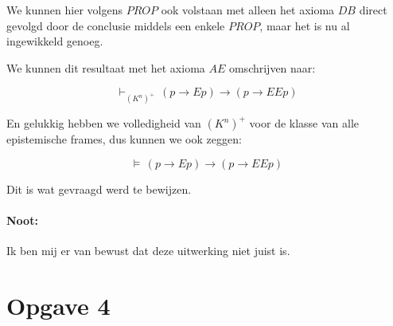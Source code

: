\documentclass[a4paper,11pt]{article}
\begin{document}
We kunnen hier volgens $PROP$ ook volstaan met alleen het axioma $DB$ direct
gevolgd door de conclusie middels een enkele $PROP$, maar het is nu al
ingewikkeld genoeg.

We kunnen dit resultaat met het axioma $AE$ omschrijven naar:

\begin{displaymath}
\vdash_{(K^{n})^{+}} \, (p \to E p) \to (p \to E E p)
\end{displaymath}

En gelukkig hebben we volledigheid van $(K^{n})^{+}$ voor de klasse van alle
epistemische frames, dus kunnen we ook zeggen:

\begin{displaymath}
\vDash \, (p \to E p) \to (p \to E E p)
\end{displaymath}

Dit is wat gevraagd werd te bewijzen.

\paragraph{Noot:}

Ik ben mij er van bewust dat deze uitwerking niet juist is.


\section*{Opgave 4}
\end{document}
